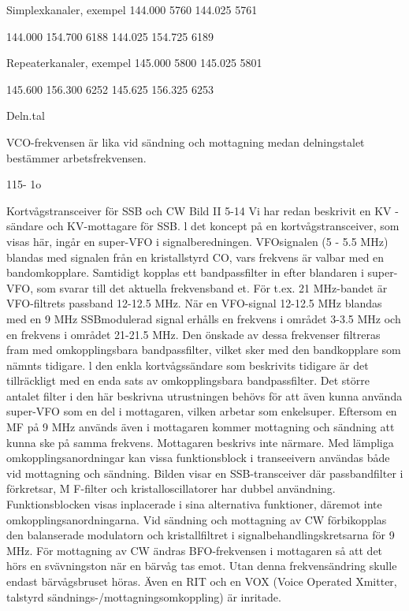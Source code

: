 \documentclass[a4paper,twoside,twocolumn,openright]{book}
\begin{document}
{{{Simplexkanaler,
exempel
144.000 5760
144.025 5761

144.000 154.700 6188
144.025 154.725 6189

Repeaterkanaler,
exempel
145.000 5800
145.025 5801

145.600 156.300 6252
145.625 156.325 6253

Deln.tal

VCO-frekvensen är lika vid sändning och
mottagning medan delningstalet bestämmer
arbetsfrekvensen.

115- 1o

Kortvågstransceiver för SSB och CW
Bild II 5-14
Vi har redan beskrivit en KV -sändare och
KV-mottagare för SSB. l det koncept på en
kortvågstransceiver, som visas här, ingår
en super-VFO i signalberedningen. VFOsignalen (5 - 5.5 MHz) blandas med signalen från en kristallstyrd CO, vars frekvens är
valbar med en bandomkopplare. Samtidigt
kopplas ett bandpassfilter in efter blandaren
i super-VFO, som svarar till det aktuella
frekvensband et.
För t.ex. 21 MHz-bandet är VFO-filtrets
passband 12-12.5 MHz. När en VFO-signal
12-12.5 MHz blandas med en 9 MHz SSBmodulerad signal erhålls en frekvens i området 3-3.5 MHz och en frekvens i området
21-21.5 MHz. Den önskade av dessa frekvenser filtreras fram med omkopplingsbara
bandpassfilter, vilket sker med den bandkopplare som nämnts tidigare.
l den enkla kortvågssändare som beskrivits tidigare är det tillräckligt med en enda
sats av omkopplingsbara bandpassfilter. Det
större antalet filter i den här beskrivna utrustningen behövs för att även kunna använda super-VFO som en del i mottagaren,
vilken arbetar som enkelsuper. Eftersom en
MF på 9 MHz används även i mottagaren
kommer mottagning och sändning att kunna
ske på samma frekvens.
Mottagaren beskrivs inte närmare. Med
lämpliga omkopplingsanordningar kan vissa funktionsblock i transeeivern användas
både vid mottagning och sändning. Bilden
visar en SSB-transceiver där passbandfilter
i förkretsar, M F-filter och kristalloscillatorer
har dubbel användning. Funktionsblocken
visas inplacerade i sina alternativa funktioner, däremot inte omkopplingsanordningarna.
Vid sändning och mottagning av CW
förbikopplas den balanserade modulatorn
och kristallfiltret i signalbehandlingskretsarna för 9 MHz. För mottagning av CW ändras
BFO-frekvensen i mottagaren så att det
hörs en svävningston när en bärvåg tas
emot. Utan denna frekvensändring skulle
endast bärvågsbruset höras.
Även en RIT och en VOX (Voice Operated Xmitter, talstyrd sändnings-/mottagningsomkoppling) är inritade.

}}}
\end{document}
